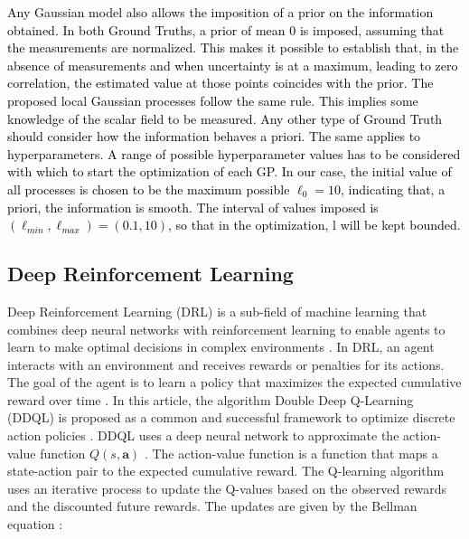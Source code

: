 \documentclass[journal]{IEEEtran}
\newcommand\changes[1]{\textcolor{black}{#1}}
\newcommand\vect[1]{\boldsymbol{#1}}
\begin{document}
\changes{Any Gaussian model also allows the imposition of a prior on the information obtained. In both Ground Truths, a prior of mean 0 is imposed, assuming that the measurements are normalized. This makes it possible to establish that, in the absence of measurements and when uncertainty is at a maximum, leading to zero correlation, the estimated value at those points coincides with the prior. The proposed local Gaussian processes follow the same rule. This implies some knowledge of the scalar field to be measured. Any other type of Ground Truth should consider how the information behaves a priori. The same applies to hyperparameters. A range of possible hyperparameter values has to be considered with which to start the optimization of each GP. In our case, the initial value of all processes is chosen to be the maximum possible $\ell_{0} = 10$, indicating that, a priori, the information is smooth. The interval of values imposed is $(\ell_{min}, \ell_{max}) = (0.1, 10)$, so that in the optimization, l will be kept bounded.}
     
\subsection{Deep Reinforcement Learning}

Deep Reinforcement Learning (DRL) is a sub-field of machine learning that combines deep neural networks with reinforcement learning to enable agents to learn to make optimal decisions in complex environments \cite{mnih_human-level_2015}. In DRL, an agent interacts with an environment and receives rewards or penalties for its actions. The goal of the agent is to learn a policy that maximizes the expected cumulative reward over time \cite{sutton_reinforcement_2018}. In this article, the algorithm Double Deep Q-Learning (DDQL) is proposed as a common and successful framework to optimize discrete action policies \cite{yanes_deep_2020, yanes_multiagent_2021, censoring_yanes_2022}. DDQL uses a deep neural network to approximate the action-value function $Q(s,\vect{a})$ \cite{mnih_human-level_2015}. The action-value function is a function that maps a state-action pair to the expected cumulative reward. The Q-learning algorithm uses an iterative process to update the Q-values based on the observed rewards and the discounted future rewards. The updates are given by the Bellman equation \cite{bellman}:

\end{document}
